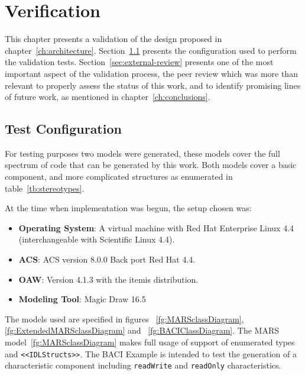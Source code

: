 \chapter{Verification}
\label{ch:verification}
This chapter presents a validation of the design proposed in chapter~\ref{ch:architecture}.
Section~\ref{sec:test-configuration}
presents the configuration used to perform the
validation tests.
Section~\ref{sec:external-review} presents one of the most important
aspect of the validation process,
the peer review
which was more than relevant to properly assess the status of this
work, and to identify promising lines of future work,
as mentioned in chapter~\ref{ch:conclusions}.

\section{Test Configuration}
\label{sec:test-configuration}
For testing purposes two models were generated,
these models cover the full spectrum of code that can be generated by
this work.
Both models cover a basic component,
and more complicated structures as enumerated in table~\ref{tb:stereotypes}.

At the time when implementation was begun,
the setup chosen was:
\begin{itemize}
\item\textbf{Operating System}: A virtual machine with Red Hat Enterprise Linux 4.4 (interchangeable with Scientific Linux 4.4).
\item\textbf{ACS}: ACS version 8.0.0 Back port Red Hat 4.4.
\item\textbf{OAW}: Version 4.1.3 with the itemis distribution.
\item\textbf{Modeling Tool}: Magic Draw 16.5
\end{itemize}

The models used are specified in figures~%
\ref{fg:MARSclassDiagram},~%
\ref{fg:ExtendedMARSclassDiagram} and~%
\ref{fg:BACIClassDiagram}.
The MARS model~\ref{fg:MARSclassDiagram} makes full usage of support of enumerated types
and \texttt{<<IDLStructs>>}.
The BACI Example is intended to test the generation of a characteristic component
including \lstinline[language=IDL]!readWrite! and \lstinline[language=IDL]!readOnly! characteristics.

